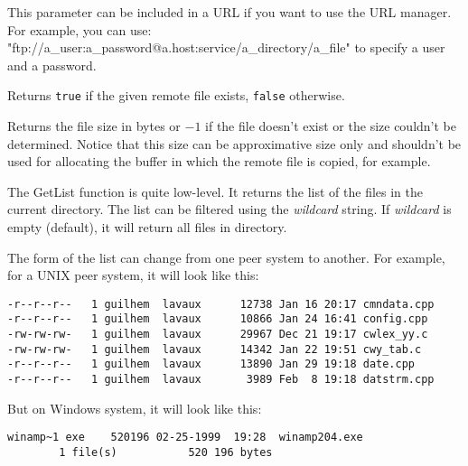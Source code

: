 
This parameter can be included in a URL if you want to use the URL manager.
For example, you can use: "ftp://a\_user:a\_password@a.host:service/a\_directory/a\_file"
to specify a user and a password.



\label{wxftpfileexists}


Returns {\tt true} if the given remote file exists, {\tt false} otherwise.


\label{wxftpgetfilesize}


Returns the file size in bytes or $-1$ if the file doesn't exist or the size
couldn't be determined. Notice that this size can be approximative size only
and shouldn't be used for allocating the buffer in which the remote file is
copied, for example.


\label{wxftpgetdirlist}


The GetList function is quite low-level. It returns the list of the files in
the current directory. The list can be filtered using the {\it wildcard} string.
If {\it wildcard} is empty (default), it will return all files in directory.

The form of the list can change from one peer system to another. For example,
for a UNIX peer system, it will look like this:

\begin{verbatim}
-r--r--r--   1 guilhem  lavaux      12738 Jan 16 20:17 cmndata.cpp
-r--r--r--   1 guilhem  lavaux      10866 Jan 24 16:41 config.cpp
-rw-rw-rw-   1 guilhem  lavaux      29967 Dec 21 19:17 cwlex_yy.c
-rw-rw-rw-   1 guilhem  lavaux      14342 Jan 22 19:51 cwy_tab.c
-r--r--r--   1 guilhem  lavaux      13890 Jan 29 19:18 date.cpp
-r--r--r--   1 guilhem  lavaux       3989 Feb  8 19:18 datstrm.cpp
\end{verbatim}

But on Windows system, it will look like this:

\begin{verbatim}
winamp~1 exe    520196 02-25-1999  19:28  winamp204.exe
        1 file(s)           520 196 bytes
\end{verbatim}

